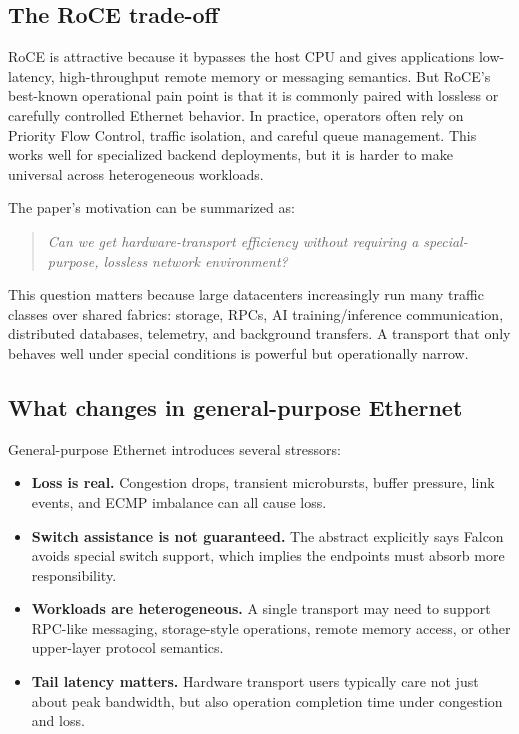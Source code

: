 \documentclass[11pt]{article}
\begin{document}
\subsection{The RoCE trade-off}

RoCE is attractive because it bypasses the host CPU and gives applications low-latency, high-throughput remote memory or messaging semantics. But RoCE's best-known operational pain point is that it is commonly paired with lossless or carefully controlled Ethernet behavior. In practice, operators often rely on Priority Flow Control, traffic isolation, and careful queue management. This works well for specialized backend deployments, but it is harder to make universal across heterogeneous workloads.

The paper's motivation can be summarized as:

\begin{quote}
\emph{Can we get hardware-transport efficiency without requiring a special-purpose, lossless network environment?}
\end{quote}

This question matters because large datacenters increasingly run many traffic classes over shared fabrics: storage, RPCs, AI training/inference communication, distributed databases, telemetry, and background transfers. A transport that only behaves well under special conditions is powerful but operationally narrow.

\subsection{What changes in general-purpose Ethernet}

General-purpose Ethernet introduces several stressors:

\begin{itemize}
  \item \textbf{Loss is real.} Congestion drops, transient microbursts, buffer pressure, link events, and ECMP imbalance can all cause loss.
  \item \textbf{Switch assistance is not guaranteed.} The abstract explicitly says Falcon avoids special switch support, which implies the endpoints must absorb more responsibility.
  \item \textbf{Workloads are heterogeneous.} A single transport may need to support RPC-like messaging, storage-style operations, remote memory access, or other upper-layer protocol semantics.
  \item \textbf{Tail latency matters.} Hardware transport users typically care not just about peak bandwidth, but also operation completion time under congestion and loss.
\end{itemize}
\end{document}
